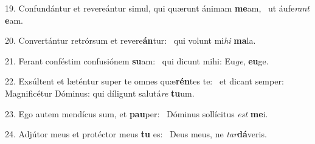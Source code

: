 19. Confundántur et revereántur simul, qui quærunt ánimam \textbf{me}am, \ast\  ut áufe\textit{rant} \textbf{e}am.\

20. Convertántur retrórsum et revere\textbf{án}tur: \ast\  qui volunt mi\textit{hi} \textbf{ma}la.\

21. Ferant conféstim confusiónem \textbf{su}am: \ast\  qui dicunt mihi: Eu\textit{ge}, \textbf{eu}ge.\

22. Exsúltent et læténtur super te omnes quæ\textbf{rén}tes te: \ast\  et dicant semper: Magnificétur Dóminus: qui díligunt salutá\textit{re} \textbf{tu}um.\

23. Ego autem mendícus sum, et \textbf{pau}per: \ast\  Dóminus sollícitus \textit{est} \textbf{me}i.\

24. Adjútor meus et protéctor meus \textbf{tu} es: \ast\  Deus meus, ne \textit{tar}\textbf{dá}veris.\

